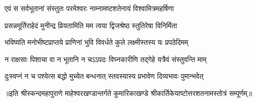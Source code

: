 \twolineshloka
{एवं स सर्वभूतानां संस्तुतः परमेश्वरः}
{नाम्नामष्टशतेनायं विश्वामित्रमहर्षिणा}

\twolineshloka
{प्रसन्नमूर्तिराहेदं मुनीन्द्र व्रियतामिति}
{मम त्वया द्विजश्रेष्ठ स्तुतिरेषा विनिर्मिता}

\twolineshloka
{भविष्यति मनोभीष्टप्राप्तये प्राणिनां भुवि}
{विवर्धते कुले लक्ष्मीस्तस्य यः प्रपठेदिमम्}

\twolineshloka
{न राक्षसाः पिशाचा वा न भूतानि न चऽऽपदः}
{विघ्नकारीणि तद्गेहे यत्रैवं संस्तुवन्ति माम्}

\twolineshloka
{दुःस्वप्नं न च पश्येत्स बद्धो मुच्येत बन्धनात्}
{स्तवस्यास्य प्रभावेण दिव्यभावः पुमान्भवेत्}

{॥इति श्रीस्कन्दमहापुराणे माहेश्वरखण्डान्तर्गते कुमारिकाखण्डे श्रीकार्तिकेयाष्टोत्तरशतनामस्तोत्रं सम्पूर्णम्॥}